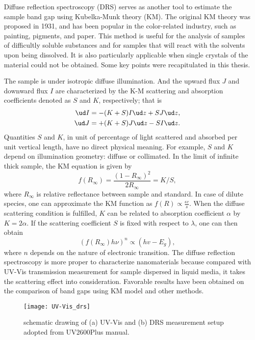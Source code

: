 Diffuse reflection spectroscopy (DRS) serves as another tool to estimate the sample band gap using Kubelka-Munk theory (KM).\cite{Tandon1970} The original KM theory was proposed in 1931,\cite{Kubelka1931} and has been popular in the color-related industry, such as painting, pigments, and paper. This method is useful for the analysis of samples of difficultly soluble substances and for samples that will react with the solvents upon being dissolved. It is also particularly applicable when single crystals of the material could not be obtained. Some key points were recapitulated in this thesis.

The sample is under isotropic diffuse illumination. And the upward flux $J$ and downward flux $I$ are characterized by the K-M scattering and absorption coefficients denoted as $S$ and $K$, respectively; that is
\begin{align}
\ud I &= - (K + S)I \ud z + SJ\ud z,\\
\ud J &= + (K + S)J \ud z - SI\ud z.
\end{align}
Quantities $S$ and $K$, in unit of percentage of light scattered and absorbed per unit vertical length, have no direct physical meaning. For example, $S$ and $K$ depend on illumination geometry: diffuse or collimated. In the limit of infinite thick sample, the KM equation is given by
\begin{equation}
f(R_\infty) = \frac{(1-R_\infty)^2}{2R_\infty} = K/S,
\end{equation}
where $R_\infty$ is relative reflectance between sample and standard. In case of dilute species, one can approximate the KM function as $f(R) \propto \frac{\epsilon c}{s}$. When the diffuse scattering condition is fulfilled, $K$ can be related to absorption coefficient $\alpha$ by $K = 2\alpha$. If the scattering coefficient $S$ is fixed with respect to $\lambda$, one can then obtain
\begin{equation}
(f(R_\infty) h \nu)^n \propto (hv - E_g),
\end{equation}
where $n$ depends on the nature of electronic transition. The diffuse reflection spectroscopy is more proper to characterize nanomaterials because compared with UV-Vis transmission measurement for sample dispersed in liquid media, it takes the scattering effect into consideration. Favorable results have been obtained on the comparison of band gaps using KM model and other methods.\cite{Tandon1970,Morales2007} 

\begin{figure}[htb]
\centering
\texttt{[image: UV-Vis\_drs]}
\caption[UV-Vis and DRS measurement]{schematic drawing of (a) UV-Vis and (b) DRS measurement setup adopted from UV2600Plus manual.}
\label{fig:ch2uvvis}
\end{figure}

